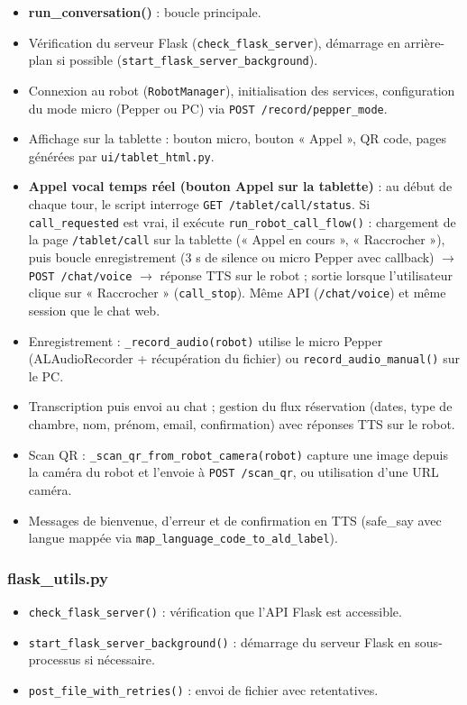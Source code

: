 \documentclass[12pt,a4paper]{article}
\begin{document}
\begin{itemize}[noitemsep]
  \item \textbf{run\_conversation()} : boucle principale.
  \item Vérification du serveur Flask (\texttt{check\_flask\_server}), démarrage en arrière-plan si possible (\texttt{start\_flask\_server\_background}).
  \item Connexion au robot (\texttt{RobotManager}), initialisation des services, configuration du mode micro (Pepper ou PC) via \texttt{POST /record/pepper\_mode}.
  \item Affichage sur la tablette : bouton micro, bouton « Appel », QR code, pages générées par \texttt{ui/tablet\_html.py}.
  \item \textbf{Appel vocal temps réel (bouton Appel sur la tablette)} : au début de chaque tour, le script interroge \texttt{GET /tablet/call/status}. Si \texttt{call\_requested} est vrai, il exécute \texttt{run\_robot\_call\_flow()} : chargement de la page \texttt{/tablet/call} sur la tablette (« Appel en cours », « Raccrocher »), puis boucle enregistrement (3 s de silence ou micro Pepper avec callback) $\rightarrow$ \texttt{POST /chat/voice} $\rightarrow$ réponse TTS sur le robot ; sortie lorsque l'utilisateur clique sur « Raccrocher » (\texttt{call\_stop}). Même API (\texttt{/chat/voice}) et même session que le chat web.
  \item Enregistrement : \texttt{\_record\_audio(robot)} utilise le micro Pepper (ALAudioRecorder + récupération du fichier) ou \texttt{record\_audio\_manual()} sur le PC.
  \item Transcription puis envoi au chat ; gestion du flux réservation (dates, type de chambre, nom, prénom, email, confirmation) avec réponses TTS sur le robot.
  \item Scan QR : \texttt{\_scan\_qr\_from\_robot\_camera(robot)} capture une image depuis la caméra du robot et l'envoie à \texttt{POST /scan\_qr}, ou utilisation d'une URL caméra.
  \item Messages de bienvenue, d'erreur et de confirmation en TTS (safe\_say avec langue mappée via \texttt{map\_language\_code\_to\_ald\_label}).
\end{itemize}

\subsubsection{flask\_utils.py}

\begin{itemize}[noitemsep]
  \item \texttt{check\_flask\_server()} : vérification que l'API Flask est accessible.
  \item \texttt{start\_flask\_server\_background()} : démarrage du serveur Flask en sous-processus si nécessaire.
  \item \texttt{post\_file\_with\_retries()} : envoi de fichier avec retentatives.
\end{itemize}
\end{document}
